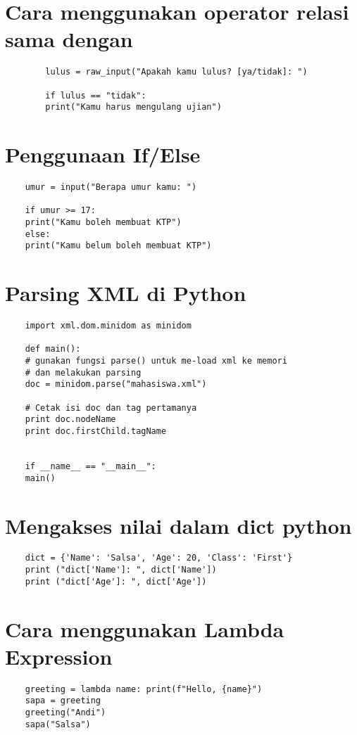 \documentclass[12pt]{article} %
\begin{document}
\section{Cara menggunakan operator relasi sama dengan}
\begin{lstlisting}
		lulus = raw_input("Apakah kamu lulus? [ya/tidak]: ")
		
		if lulus == "tidak":
		print("Kamu harus mengulang ujian")
\end{lstlisting}

\section{Penggunaan If/Else}
\begin{lstlisting}
	umur = input("Berapa umur kamu: ")
	
	if umur >= 17:
	print("Kamu boleh membuat KTP")
	else:
	print("Kamu belum boleh membuat KTP")
\end{lstlisting}

\section{Parsing XML di Python}
\begin{lstlisting}
	import xml.dom.minidom as minidom
	
	def main():
	# gunakan fungsi parse() untuk me-load xml ke memori 
	# dan melakukan parsing
	doc = minidom.parse("mahasiswa.xml")
	
	# Cetak isi doc dan tag pertamanya
	print doc.nodeName
	print doc.firstChild.tagName
	
	
	if __name__ == "__main__":
	main()

\end{lstlisting}

\section{Mengakses nilai dalam dict python}
\begin{lstlisting}
	dict = {'Name': 'Salsa', 'Age': 20, 'Class': 'First'}
	print ("dict['Name']: ", dict['Name'])
	print ("dict['Age']: ", dict['Age'])
\end{lstlisting}

\section{Cara menggunakan Lambda Expression}
\begin{lstlisting}
	greeting = lambda name: print(f"Hello, {name}")
	sapa = greeting
	greeting("Andi")
	sapa("Salsa")
\end{lstlisting}
\end{document}
